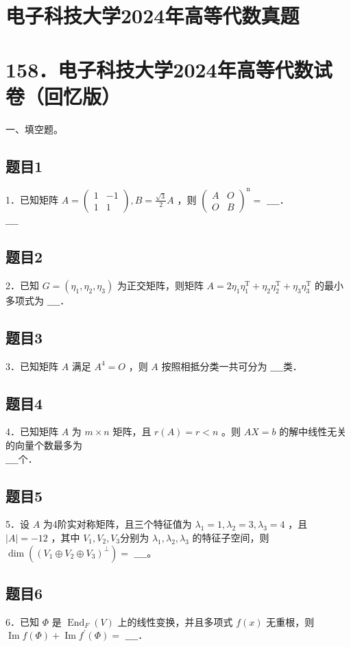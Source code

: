 \documentclass{article}
\begin{document}
\section*{电子科技大学2024年高等代数真题}
\section*{158．电子科技大学2024年高等代数试卷（回忆版）}
一、填空题。\\

\subsection{题目1}
1．已知矩阵 \(A=\left(\begin{array}{cc}1 & -1 \\ 1 & 1\end{array}\right), B=\frac{\sqrt{3}}{2} A\) ，则 \(\left(\begin{array}{cc}A & O \\ O & B\end{array}\right)^{\mathrm{n}}=\) \(\_\_\_\_\)．\\
\(\_\_\_\_\)

\subsection{题目2}
2．已知 \(G=\left(\eta_{1}, \eta_{2}, \eta_{3}\right)\) 为正交矩阵，则矩阵 \(A=2 \eta_{1} \eta_{1}^{\mathrm{T}}+\eta_{2} \eta_{2}^{\mathrm{T}}+\eta_{3} \eta_{3}^{\mathrm{T}}\) 的最小多项式为 \(\_\_\_\_\)．

\subsection{题目3}
3．已知矩阵 \(A\) 满足 \(A^{4}=O\) ，则 \(A\) 按照相抵分类一共可分为 \(\_\_\_\_\)类．

\subsection{题目4}
4．已知矩阵 \(A\) 为 \(m \times n\) 矩阵，且 \(r(A)=r<n\) 。则 \(A X=b\) 的解中线性无关的向量个数最多为\\
\(\_\_\_\_\)个．

\subsection{题目5}
5．设 \(A\) 为4阶实对称矩阵，且三个特征值为 \(\lambda_{1}=1, \lambda_{2}=3, \lambda_{3}=4\) ，且 \(|A|=-12\) ，其中 \(V_{1}, V_{2}, V_{3}\)分别为 \(\lambda_{1}, \lambda_{2}, \lambda_{3}\) 的特征子空间，则 \(\operatorname{dim}\left(\left(V_{1} \oplus V_{2} \oplus V_{3}\right)^{\perp}\right)=\) \(\_\_\_\_\)。

\subsection{题目6}
6．已知 \(\Phi\) 是 \(\operatorname{End}_{F}(V)\) 上的线性变换，并且多项式 \(f(x)\) 无重根，则 \(\operatorname{Im} f(\Phi)+\operatorname{Im} f^{\prime}(\Phi)=\) \(\_\_\_\_\)．
\end{document}
